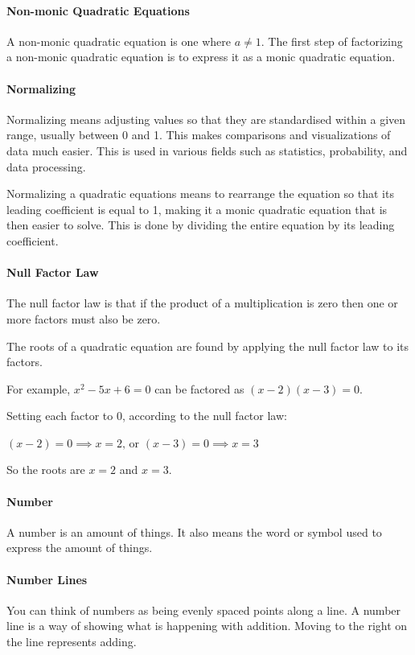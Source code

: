 \documentclass[12pt]{article}
\begin{document}
{\paragraph{Non-monic Quadratic Equations}
A non-monic quadratic equation is one where $a\neq1$.
The first step of factorizing a non-monic quadratic equation is to express it as a monic quadratic equation.

\paragraph{Normalizing}
Normalizing means adjusting values so that they are standardised within a given range, usually between 0 and 1. This makes comparisons and visualizations of data much easier. This is used in various fields such as statistics, probability, and data processing.

Normalizing a quadratic equations means to rearrange the equation so that its leading coefficient is equal to 1, making it a monic quadratic equation that is then easier to solve. This is done by dividing the entire equation by its leading coefficient.

\paragraph{Null Factor Law}
The null factor law is that if the product of a multiplication is zero then one or more factors must also be zero.

The roots of a quadratic equation are found by applying the null factor law to its factors.

For example, $x^2 - 5x + 6 = 0$ can be factored as $(x - 2)(x - 3) = 0$.

Setting each factor to 0, according to the null factor law:

$(x - 2) = 0 \implies x = 2 \textrm{, or } (x - 3) = 0 \implies x = 3$

So the roots are $x=2$ and $x=3$.

\paragraph{Number}
A number is an amount of things. It also means the word or symbol used to express the amount of things.

\paragraph{Number Lines}
You can think of numbers as being evenly spaced points along a line. A number line is a way of showing what is happening with addition. Moving to the right on the line represents adding.\\

}
\end{document}
